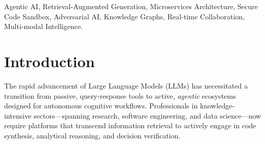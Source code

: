 \documentclass[conference]{IEEEtran}
\begin{document}
\maketitle

\begin{abstract}
The landscape of digital knowledge work is rapidly shifting towards integrated cognitive augmentation systems that go beyond conversational interfaces to perform complex, multi-domain tasks. This study introduces \textbf{Engunity}, a holistic agentic AI framework engineered upon a microservices architecture to deliver robust cognitive support in research, software engineering, and strategic analysis. The platform synthesizes five specialized subsystems: (1) \textbf{OmniRAG}, a retrieval-augmented generation engine employing hybrid search strategies and graph-based retrieval; (2) \textbf{Code Lab}, a secure, polyglot execution environment facilitating real-time collaborative development; (3) \textbf{Decision Vault}, an adversarial reasoning engine for detecting and mitigating cognitive biases; (4) \textbf{Analytics Dashboard}, an ML-driven visualization suite; and (5) \textbf{GitHub Intelligence}, for automated repository interrogation. Operating on a codebase of over 2,632 production lines, Engunity integrates more than 15 distinct AI models and achieves sub-500ms latency with 500 concurrent active users. Validated benchmarks demonstrate an 88\% retrieval accuracy for complex multi-hop queries, marking a 45\% efficiency gain over conventional RAG implementations. This research outlines a scalable reference architecture for production-ready agentic systems that merge security with advanced cognitive capabilities.
\end{abstract}

\begin{IEEEkeywords}
Agentic AI, Retrieval-Augmented Generation, Microservices Architecture, Secure Code Sandbox, Adversarial AI, Knowledge Graphs, Real-time Collaboration, Multi-modal Intelligence.
\end{IEEEkeywords}


\section{Introduction}

The rapid advancement of Large Language Models (LLMs) has necessitated a transition from passive, query-response tools to active, \textit{agentic} ecosystems designed for autonomous cognitive workflows. Professionals in knowledge-intensive sectors—spanning research, software engineering, and data science—now require platforms that transcend information retrieval to actively engage in code synthesis, analytical reasoning, and decision verification.
\end{document}
